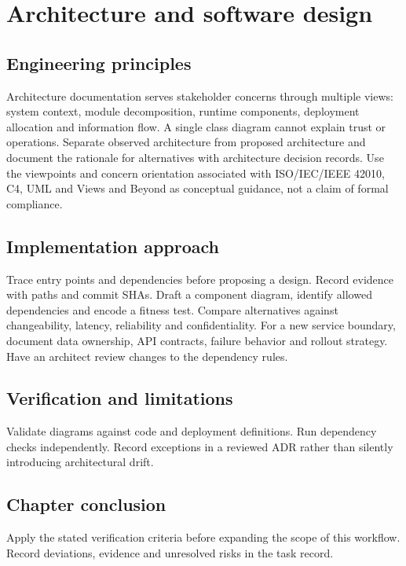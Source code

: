 \chapter{Architecture and software design}

\section{Engineering principles}

Architecture documentation serves stakeholder concerns through multiple views: system context, module decomposition, runtime components, deployment allocation and information flow. A single class diagram cannot explain trust or operations. Separate observed architecture from proposed architecture and document the rationale for alternatives with architecture decision records. Use the viewpoints and concern orientation associated with ISO/IEC/IEEE 42010, C4, UML and Views and Beyond as conceptual guidance, not a claim of formal compliance.

\section{Implementation approach}

Trace entry points and dependencies before proposing a design. Record evidence with paths and commit SHAs. Draft a component diagram, identify allowed dependencies and encode a fitness test. Compare alternatives against changeability, latency, reliability and confidentiality. For a new service boundary, document data ownership, API contracts, failure behavior and rollout strategy. Have an architect review changes to the dependency rules.

\section{Verification and limitations}

Validate diagrams against code and deployment definitions. Run dependency checks independently. Record exceptions in a reviewed ADR rather than silently introducing architectural drift.

\section{Chapter conclusion}

Apply the stated verification criteria before expanding the scope of this workflow. Record deviations, evidence and unresolved risks in the task record.
